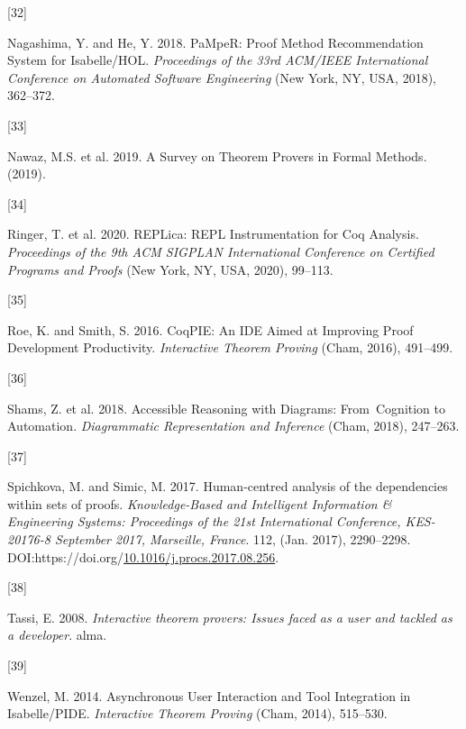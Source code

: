 \documentclass[
]{article}
\newlength{\cslhangindent}
\newlength{\csllabelwidth}
\newlength{\cslentryspacingunit} %
\newenvironment{CSLReferences}[2] %
 {%
  \setlength{\parindent}{0pt}
  \ifodd #1
  \let\oldpar\par
  \def\par{\hangindent=\cslhangindent\oldpar}
  \fi
  \setlength{\parskip}{#2\cslentryspacingunit}
 }%
 {}
\newcommand{\CSLLeftMargin}[1]{\parbox[t]{\csllabelwidth}{#1}}
\newcommand{\CSLRightInline}[1]{\parbox[t]{\linewidth - \csllabelwidth}{#1}\break}
\begin{document}
\begin{CSLReferences}{0}{0}
\leavevmode{}%
\CSLLeftMargin{{[}32{]} }
\CSLRightInline{Nagashima, Y. and He, Y. 2018. {PaMpeR}: {Proof}
{Method} {Recommendation} {System} for {Isabelle}/{HOL}.
\emph{Proceedings of the 33rd {ACM}/{IEEE} {International} {Conference}
on {Automated} {Software} {Engineering}} (New York, NY, USA, 2018),
362--372.}

\leavevmode{}%
\CSLLeftMargin{{[}33{]} }
\CSLRightInline{Nawaz, M.S. et al. 2019. A {Survey} on {Theorem}
{Provers} in {Formal} {Methods}. (2019).}

\leavevmode{}%
\CSLLeftMargin{{[}34{]} }
\CSLRightInline{Ringer, T. et al. 2020. {REPLica}: {REPL}
{Instrumentation} for {Coq} {Analysis}. \emph{Proceedings of the 9th
{ACM} {SIGPLAN} {International} {Conference} on {Certified} {Programs}
and {Proofs}} (New York, NY, USA, 2020), 99--113.}

\leavevmode{}%
\CSLLeftMargin{{[}35{]} }
\CSLRightInline{Roe, K. and Smith, S. 2016. {CoqPIE}: {An} {IDE} {Aimed}
at {Improving} {Proof} {Development} {Productivity}. \emph{Interactive
{Theorem} {Proving}} (Cham, 2016), 491--499.}

\leavevmode{}%
\CSLLeftMargin{{[}36{]} }
\CSLRightInline{Shams, Z. et al. 2018. Accessible {Reasoning} with
{Diagrams}: {From}~{Cognition} to {Automation}. \emph{Diagrammatic
{Representation} and {Inference}} (Cham, 2018), 247--263.}

\leavevmode{}%
\CSLLeftMargin{{[}37{]} }
\CSLRightInline{Spichkova, M. and Simic, M. 2017. Human-centred analysis
of the dependencies within sets of proofs. \emph{Knowledge-Based and
Intelligent Information \& Engineering Systems: Proceedings of the 21st
International Conference, KES-20176-8 September 2017, Marseille,
France}. 112, (Jan. 2017), 2290--2298.
DOI:https://doi.org/\href{https://doi.org/10.1016/j.procs.2017.08.256}{10.1016/j.procs.2017.08.256}.}

\leavevmode{}%
\CSLLeftMargin{{[}38{]} }
\CSLRightInline{Tassi, E. 2008. \emph{Interactive theorem provers:
Issues faced as a user and tackled as a developer}. alma.}

\leavevmode{}%
\CSLLeftMargin{{[}39{]} }
\CSLRightInline{Wenzel, M. 2014. Asynchronous {User} {Interaction} and
{Tool} {Integration} in {Isabelle}/{PIDE}. \emph{Interactive {Theorem}
{Proving}} (Cham, 2014), 515--530.}


\end{CSLReferences}
\end{document}
